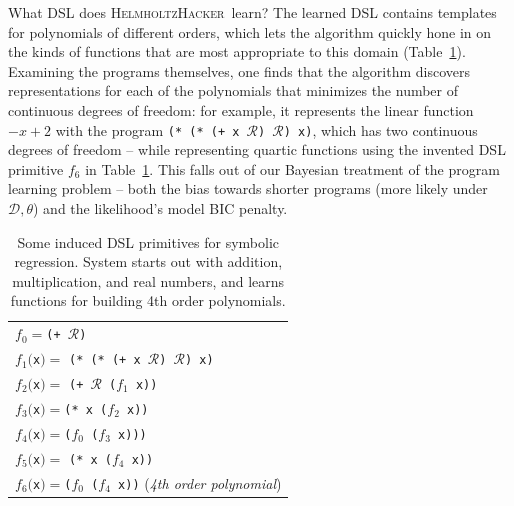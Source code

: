 \documentclass{article}
\newcommand{\system}{\textsc{HelmholtzHacker}~}
\newcommand{\probability}{\mathds{P}} %
\begin{document}
What DSL does \system learn?
The learned DSL contains templates for polynomials of different orders,
which lets the algorithm quickly hone in on the kinds of functions that are most appropriate to this domain (Table~\ref{regressionDSL}).
Examining the programs themselves,
one finds that the algorithm discovers representations for each of the polynomials that minimizes the number of continuous degrees of freedom:
for example, it represents the linear function $-x+2$ with the program 
\texttt{(* (* (+ x }$\mathcal{R}$\texttt{) }$\mathcal{R}$\texttt{) x)}, which has two continuous degrees of freedom -- while representing quartic functions using the invented DSL primitive $f_6$ in Table~\ref{regressionDSL}.
This falls out of our Bayesian treatment of the program learning problem -- both the bias towards shorter programs (more likely under $\mathcal{D},\theta$) and the likelihood's model BIC penalty.
\begin{table}
\begin{tabular}{l}
  \toprule
    $f_0 = $\texttt{(+ }$\mathcal{R}$\texttt{)}\\
    $f_1($\texttt{x}$) =$ \texttt{(* (* (+ x }$\mathcal{R}$\texttt{) }$\mathcal{R}$\texttt{) x)} \\
      $f_2($\texttt{x}$) =$ \texttt{(+ }$\mathcal{R}$\texttt{ ($f_1$ x))} \\
      $f_3($\texttt{x}$) = $\texttt{(* x (}$f_2$\texttt{ x))}\\
  $f_4($\texttt{x}$) = $\texttt{(}$f_0$\texttt{ (}$f_3$\texttt{ x)))}\\
  $f_5($\texttt{x}$) =$ \texttt{(* x (}$f_4$\texttt{ x))}\\
  $f_6($\texttt{x}$) = $\texttt{(}$f_0$\texttt{ (}$f_4$\texttt{ x))} (\emph{4th order polynomial})
  \\\bottomrule
\end{tabular}
\caption{Some induced DSL primitives for symbolic regression. System starts out with addition, multiplication, and real numbers, and learns functions for building 4th order polynomials.}\label{regressionDSL}
\end{table}
\end{document}
